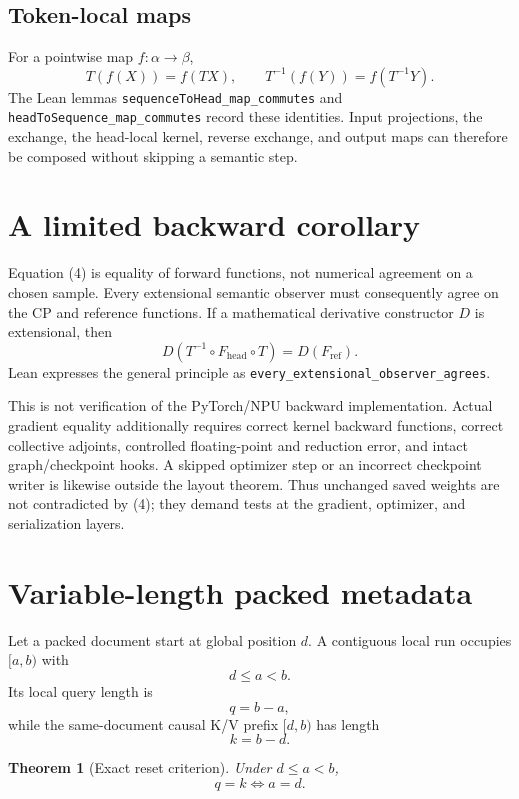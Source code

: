 \documentclass[11pt,a4paper]{article}
\newtheorem{theorem}{Theorem}
\begin{document}
\subsection{Token-local maps}

For a pointwise map $f:\alpha\to\beta$,
\[
T(f(X))=f(TX),\qquad T^{-1}(f(Y))=f(T^{-1}Y).
\]
The Lean lemmas \texttt{sequenceToHead\_map\_commutes} and \texttt{headToSequence\_map\_commutes} record these identities. Input projections, the exchange, the head-local kernel, reverse exchange, and output maps can therefore be composed without skipping a semantic step.

\section{A limited backward corollary}

Equation (4) is equality of forward functions, not numerical agreement on a chosen sample. Every extensional semantic observer must consequently agree on the CP and reference functions. If a mathematical derivative constructor $D$ is extensional, then
\[
D(T^{-1}\circ F_{\mathrm{head}}\circ T)=D(F_{\mathrm{ref}}). \tag{5}
\]
Lean expresses the general principle as \texttt{every\_extensional\_observer\_agrees}.

This is not verification of the PyTorch/NPU backward implementation. Actual gradient equality additionally requires correct kernel backward functions, correct collective adjoints, controlled floating-point and reduction error, and intact graph/checkpoint hooks. A skipped optimizer step or an incorrect checkpoint writer is likewise outside the layout theorem. Thus unchanged saved weights are not contradicted by (4); they demand tests at the gradient, optimizer, and serialization layers.

\section{Variable-length packed metadata}

Let a packed document start at global position $d$. A contiguous local run occupies $[a,b)$ with
\[
d\le a<b.
\]
Its local query length is
\[
q=b-a, \tag{6}
\]
while the same-document causal K/V prefix $[d,b)$ has length
\[
k=b-d. \tag{7}
\]

\begin{theorem}[Exact reset criterion]
Under $d\le a<b$,
\[
q=k\iff a=d. \tag{8}
\]
\end{theorem}
\end{document}
